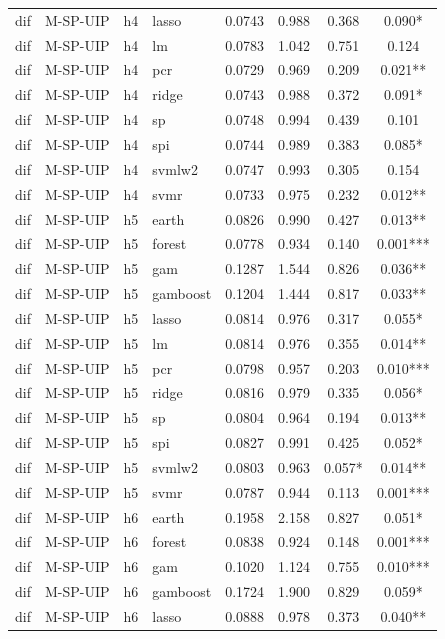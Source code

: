 \begin{ThreePartTable}
\begin{longtable}[t]{llclcccc}
dif & M-SP-UIP & h4 & lasso & 0.0743 & 0.988 & 0.368 & 0.090*\\
dif & M-SP-UIP & h4 & lm & 0.0783 & 1.042 & 0.751 & 0.124\\
dif & M-SP-UIP & h4 & pcr & 0.0729 & 0.969 & 0.209 & 0.021**\\
dif & M-SP-UIP & h4 & ridge & 0.0743 & 0.988 & 0.372 & 0.091*\\
dif & M-SP-UIP & h4 & sp & 0.0748 & 0.994 & 0.439 & 0.101\\
dif & M-SP-UIP & h4 & spi & 0.0744 & 0.989 & 0.383 & 0.085*\\
dif & M-SP-UIP & h4 & svmlw2 & 0.0747 & 0.993 & 0.305 & 0.154\\
dif & M-SP-UIP & h4 & svmr & 0.0733 & 0.975 & 0.232 & 0.012**\\
\addlinespace
dif & M-SP-UIP & h5 & earth & 0.0826 & 0.990 & 0.427 & 0.013**\\
dif & M-SP-UIP & h5 & forest & 0.0778 & 0.934 & 0.140 & 0.001***\\
dif & M-SP-UIP & h5 & gam & 0.1287 & 1.544 & 0.826 & 0.036**\\
dif & M-SP-UIP & h5 & gamboost & 0.1204 & 1.444 & 0.817 & 0.033**\\
dif & M-SP-UIP & h5 & lasso & 0.0814 & 0.976 & 0.317 & 0.055*\\
dif & M-SP-UIP & h5 & lm & 0.0814 & 0.976 & 0.355 & 0.014**\\
dif & M-SP-UIP & h5 & pcr & 0.0798 & 0.957 & 0.203 & 0.010***\\
dif & M-SP-UIP & h5 & ridge & 0.0816 & 0.979 & 0.335 & 0.056*\\
dif & M-SP-UIP & h5 & sp & 0.0804 & 0.964 & 0.194 & 0.013**\\
dif & M-SP-UIP & h5 & spi & 0.0827 & 0.991 & 0.425 & 0.052*\\
dif & M-SP-UIP & h5 & svmlw2 & 0.0803 & 0.963 & 0.057* & 0.014**\\
dif & M-SP-UIP & h5 & svmr & 0.0787 & 0.944 & 0.113 & 0.001***\\
\addlinespace
dif & M-SP-UIP & h6 & earth & 0.1958 & 2.158 & 0.827 & 0.051*\\
dif & M-SP-UIP & h6 & forest & 0.0838 & 0.924 & 0.148 & 0.001***\\
dif & M-SP-UIP & h6 & gam & 0.1020 & 1.124 & 0.755 & 0.010***\\
dif & M-SP-UIP & h6 & gamboost & 0.1724 & 1.900 & 0.829 & 0.059*\\
dif & M-SP-UIP & h6 & lasso & 0.0888 & 0.978 & 0.373 & 0.040**\\

\end{longtable}
\end{ThreePartTable}
